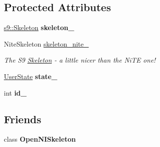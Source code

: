 \subsection*{Protected Attributes}
\begin{DoxyCompactItemize}
\item 
\hypertarget{classs9_1_1oni_1_1OpenNISkeleton_1_1User_a205e5f14dec80460081764776daf373d}{\hyperlink{classs9_1_1Skeleton}{s9\-::\-Skeleton} {\bfseries skeleton\-\_\-}}\label{classs9_1_1oni_1_1OpenNISkeleton_1_1User_a205e5f14dec80460081764776daf373d}

\item 
\hypertarget{classs9_1_1oni_1_1OpenNISkeleton_1_1User_a7aadf06fda9a9c7b945b90f9a942c95f}{Nite\-Skeleton \hyperlink{classs9_1_1oni_1_1OpenNISkeleton_1_1User_a7aadf06fda9a9c7b945b90f9a942c95f}{skeleton\-\_\-nite\-\_\-}}\label{classs9_1_1oni_1_1OpenNISkeleton_1_1User_a7aadf06fda9a9c7b945b90f9a942c95f}

\begin{DoxyCompactList}\small\item\em The S9 \hyperlink{classs9_1_1Skeleton}{Skeleton} -\/ a little nicer than the Ni\-T\-E one! \end{DoxyCompactList}\item 
\hypertarget{classs9_1_1oni_1_1OpenNISkeleton_1_1User_abc8f2c6c614169090e39dffe8ddb7a2b}{\hyperlink{classs9_1_1oni_1_1OpenNISkeleton_a542f12d04d50a5cd8ec5484e1e75f16c}{User\-State} {\bfseries state\-\_\-}}\label{classs9_1_1oni_1_1OpenNISkeleton_1_1User_abc8f2c6c614169090e39dffe8ddb7a2b}

\item 
\hypertarget{classs9_1_1oni_1_1OpenNISkeleton_1_1User_a2f4e85a91050fd9e974a4fe192312355}{int {\bfseries id\-\_\-}}\label{classs9_1_1oni_1_1OpenNISkeleton_1_1User_a2f4e85a91050fd9e974a4fe192312355}

\end{DoxyCompactItemize}
\subsection*{Friends}
\begin{DoxyCompactItemize}
\item 
\hypertarget{classs9_1_1oni_1_1OpenNISkeleton_1_1User_a3c4e4e8608c185a1697475ad5caf5e12}{class {\bfseries Open\-N\-I\-Skeleton}}\label{classs9_1_1oni_1_1OpenNISkeleton_1_1User_a3c4e4e8608c185a1697475ad5caf5e12}

\end{DoxyCompactItemize}


